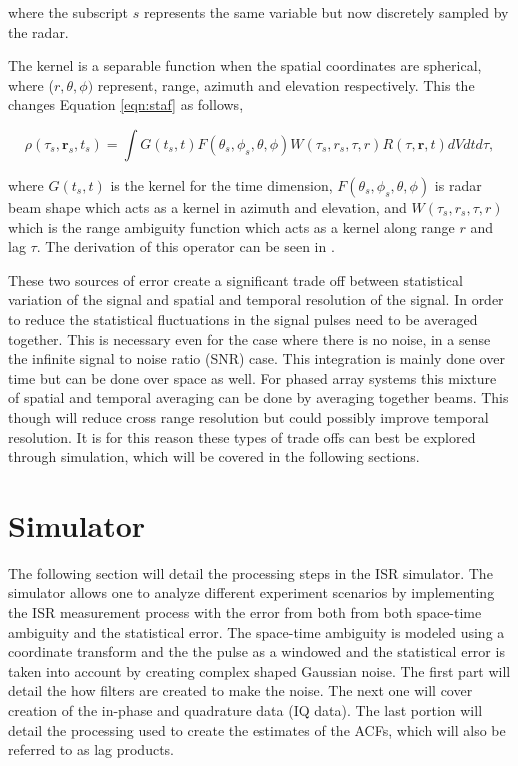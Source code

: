 \documentclass[draft,ras]{agutex}
\begin{document}
\begin{article}
\noindent where the subscript $s$ represents the same variable but now discretely sampled by the radar. 

The kernel is a separable function when the spatial coordinates are spherical, where ($r,\theta,\phi)$ represent, range, azimuth and elevation respectively. This the changes Equation \ref{eqn:staf} as follows,

\begin{equation}
\label{eqn:stafbrok}
\rho(\tau_s,\mathbf{r}_s,t_s)= \int G(t_s,t)F(\theta_s,\phi_s,\theta,\phi)W(\tau_s,r_s,\tau,r) R(\tau,\mathbf{r},t) dVdt d\tau,
\end{equation}

\noindent where $G(t_s,t)$ is the kernel for the time dimension, $F(\theta_s,\phi_s,\theta,\phi)$ is radar beam shape which acts as a kernel in azimuth and elevation, and $W(\tau_s,r_s,\tau,r) $ which is the range ambiguity function which acts as a kernel along range $r$ and lag $\tau$. The derivation of this operator can be seen in \citet{RDS:RDS20236}.

These two sources of error create a significant trade off between statistical variation of the signal and spatial and temporal resolution of the signal. In order to reduce the statistical fluctuations in the signal pulses need to be averaged together. This is necessary even for the case where there is no noise, in a sense the infinite signal to noise ratio (SNR) case. This integration is mainly done over time but can be done over space as well. For phased array systems this mixture of spatial and temporal averaging can be done by averaging together beams. This though will reduce cross range resolution but could possibly improve temporal resolution. It is for this reason these types of trade offs can best be explored through simulation, which will be covered in the following sections.
\section{Simulator}

The following section will detail the processing steps in the ISR simulator. The simulator allows one to analyze different experiment scenarios by implementing the ISR measurement process with the error from both from both space-time ambiguity and the statistical error. The space-time ambiguity is modeled using a coordinate transform and the the pulse as a windowed and the statistical error is taken into account by creating complex shaped Gaussian noise. The first part will detail the how filters are created to make the noise. The next one will cover creation of the in-phase and quadrature data (IQ data). The last portion will detail the processing used to create the estimates of the ACFs, which will also be referred to as lag products.


\end{article}
\end{document}
